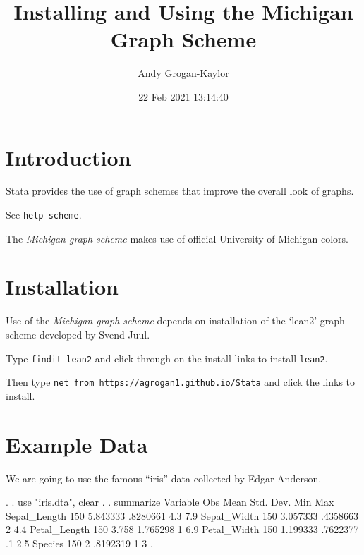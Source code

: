 \documentclass[
]{article}
\title{Installing and Using the Michigan Graph Scheme}
\author{Andy Grogan-Kaylor}
\date{22 Feb 2021 13:14:40}
\begin{document}
\maketitle

\hypertarget{introduction}{%
\section{Introduction}\label{introduction}}

Stata provides the use of graph schemes that improve the overall look of
graphs.

See \texttt{help\ scheme}.

The \emph{Michigan graph scheme} makes use of official University of
Michigan colors.

\hypertarget{installation}{%
\section{Installation}\label{installation}}

Use of the \emph{Michigan graph scheme} depends on installation of the
`lean2' graph scheme developed by Svend Juul.

Type \texttt{findit\ lean2} and click through on the install links to
install \texttt{lean2}.

Then type \texttt{net\ from\ https://agrogan1.github.io/Stata} and click
the links to install.

\hypertarget{example-data}{%
\section{Example Data}\label{example-data}}

We are going to use the famous ``iris'' data collected by Edgar
Anderson.

\begin{stlog}
. 
. use "iris.dta", clear
{\smallskip}
. 
. summarize
{\smallskip}
    Variable {\VBAR}        Obs        Mean    Std. Dev.       Min        Max
Sepal_Length {\VBAR}        150    5.843333    .8280661        4.3        7.9
 Sepal_Width {\VBAR}        150    3.057333    .4358663          2        4.4
Petal_Length {\VBAR}        150       3.758    1.765298          1        6.9
 Petal_Width {\VBAR}        150    1.199333    .7622377         .1        2.5
     Species {\VBAR}        150           2    .8192319          1          3
{\smallskip}
. 
\end{stlog}
\end{document}
